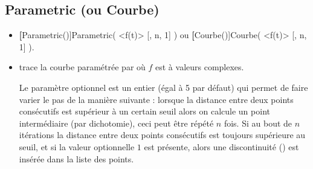 \subsection{Parametric (ou Courbe)}\label{cmdCourbe}
\begin{itemize}
 \item \util \textbf[Parametric()]{Parametric( <f(t)> [, n, 1] )} ou \textbf[Courbe()]{Courbe( <f(t)> [, n, 1] )}.
 \item \desc trace la courbe paramétrée par  où $f$ est à valeurs complexes.

Le paramètre optionnel  est un entier (égal à 5 par défaut) qui permet de faire varier le pas de la manière suivante : lorsque la distance entre deux points consécutifs est supérieur à un certain seuil alors on calcule un point intermédiaire (par dichotomie), ceci peut être répété $n$ fois. Si au bout de $n$ itérations la distance entre deux points consécutifs est toujours supérieure au seuil, et si la valeur optionnelle $1$ est présente, alors une discontinuité (\jump) est insérée dans la liste des points.
\end{itemize}

